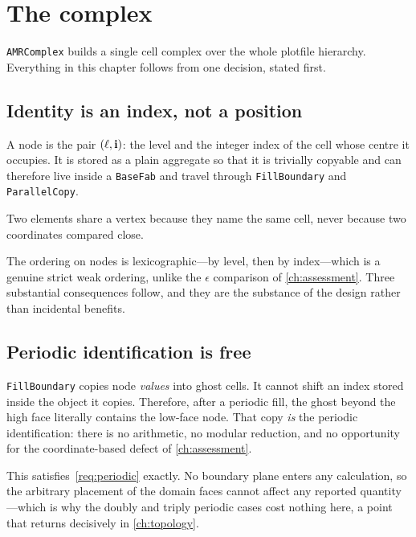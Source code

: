 \chapter{The complex}
\label{ch:complex}

\texttt{AMRComplex} builds a single cell complex over the whole plotfile
hierarchy. Everything in this chapter follows from one decision, stated first.

\section{Identity is an index, not a position}
\label{sec:identity}

A node is the pair $(\ell,\mathbf{i})$: the level and the integer index of the cell
whose centre it occupies. It is stored as a plain aggregate so that it is
trivially copyable and can therefore live inside a \texttt{BaseFab} and travel
through \texttt{FillBoundary} and \texttt{ParallelCopy}.

\begin{designrule}\label{rule:identity}
Two elements share a vertex because they name the same cell, never because two
coordinates compared close.
\end{designrule}

The ordering on nodes is lexicographic---by level, then by index---which is a
genuine strict weak ordering, unlike the $\epsilon$ comparison of
\cref{ch:assessment}. Three substantial consequences follow, and they are the
substance of the design rather than incidental benefits.

\section{Periodic identification is free}
\label{sec:periodic}

\texttt{FillBoundary} copies node \emph{values} into ghost cells. It cannot
shift an index stored inside the object it copies. Therefore, after a periodic
fill, the ghost beyond the high face literally contains the low-face node. That
copy \emph{is} the periodic identification: there is no arithmetic, no modular
reduction, and no opportunity for the coordinate-based defect of
\cref{ch:assessment}.

This satisfies~\ref{req:periodic} exactly. No boundary plane enters any
calculation, so the arbitrary placement of the domain faces cannot affect any
reported quantity---which is why the doubly and triply periodic cases cost
nothing here, a point that returns decisively in \cref{ch:topology}.

